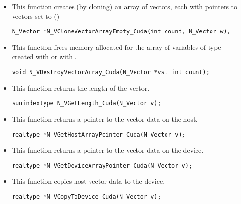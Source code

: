 \begin{itemize}
\item {}
 
  This function creates (by cloning) an array of  {\nveccuda} vectors,
  each with pointers to {\cuda} vectors set to ().
 
\begin{verbatim}
N_Vector *N_VCloneVectorArrayEmpty_Cuda(int count, N_Vector w);
\end{verbatim}


\item {}
 
 This function frees memory allocated for the array of  variables of
 type  created with  or with
 .
 

 \verb|void N_VDestroyVectorArray_Cuda(N_Vector *vs, int count);|


\item {}
 
 This function returns the length of the vector.

 \verb|sunindextype N_VGetLength_Cuda(N_Vector v);|


\item {}
 
 This function returns a pointer to the vector data on the host.

 \verb|realtype *N_VGetHostArrayPointer_Cuda(N_Vector v);|



\item {}
 
 This function returns a pointer to the vector data on the device.

 \verb|realtype *N_VGetDeviceArrayPointer_Cuda(N_Vector v);|



\item {}
 
 This function copies host vector data to the device.

 \verb|realtype *N_VCopyToDevice_Cuda(N_Vector v);|



\end{itemize}

